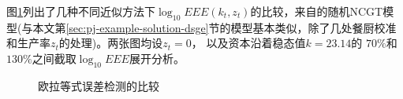 图\ref{fig:error-eee-comp}列出了几种不同近似方法下$\log_{10} EEE\left(k_{t}, z_{t} \right)$的比较，来自\citep{Aruoba:2006cz}的随机NCGT模型(与本文第\ref{sec:pj-example-solution-dsge}节的模型基本类似，除了几处餐厨校准和生产率$z_{t}$的处理)。两张图均设$z_{t}=0$，
以及资本沿着稳态值$k=23.14$的 $70\% $和$130\%$之间截取$\log_{10}EEE$展开分析。
\begin{figure}
\centering
\caption{欧拉等式误差检测的比较}
\label{fig:error-eee-comp}
\end{figure}

